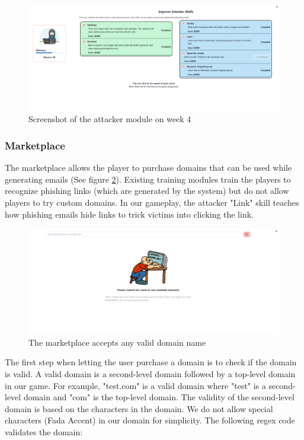 \begin{figure}[ht]
    \centering
    \includegraphics[width=1.1\textwidth]{figures/section2/attacker.png}
    \caption{Screenshot of the attacker module on week 4}
    \label{fig:attacker}
\end{figure}

\subsubsection{Marketplace}
The marketplace allows the player to purchase domains that can be used while generating emails (See figure \ref{fig:marketplace}). Existing training modules train the players to recognize phishing links (which are generated by the system) but do not allow players to try custom domains. In our gameplay, the attacker "Link" skill teaches how phishing emails hide links to trick victims into clicking the link.

\begin{figure}
    \centering
    \includegraphics[width=1\textwidth]{figures/section2/marketplace_empty.png}
    \caption{The marketplace accepts any valid domain name}
    \label{fig:marketplace}
\end{figure}

The first step when letting the user purchase a domain is to check if the domain is valid. A valid domain is a second-level domain followed by a top-level domain in our game. For example, "test.com" is a valid domain where "test" is a second-level domain and "com" is the top-level domain. The validity of the second-level domain is based on the characters in the domain. We do not allow special characters (Fada Accent) in our domain for simplicity. The following regex code validates the domain:

